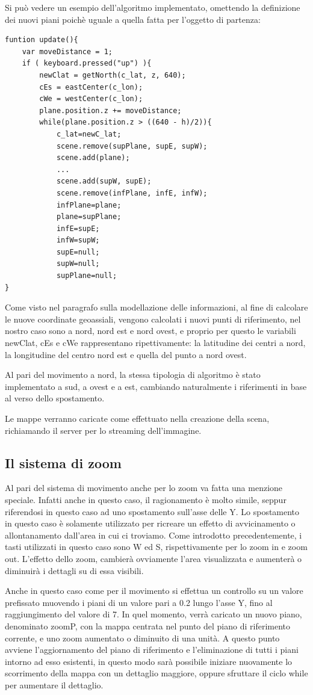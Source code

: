 Si può vedere un esempio dell'algoritmo implementato, omettendo la definizione dei nuovi piani poichè uguale a quella fatta per l'oggetto di partenza: 
\begin{verbatim}
funtion update(){
	var moveDistance = 1;
	if ( keyboard.pressed("up") ){
	    newClat = getNorth(c_lat, z, 640);
	    cEs = eastCenter(c_lon);
	    cWe = westCenter(c_lon);
	    plane.position.z += moveDistance;
	    while(plane.position.z > ((640 - h)/2)){
            c_lat=newC_lat;
            scene.remove(supPlane, supE, supW);
            scene.add(plane);
            ...
            scene.add(supW, supE);
            scene.remove(infPlane, infE, infW);
            infPlane=plane;
            plane=supPlane;
            infE=supE;
            infW=supW;
            supE=null;
            supW=null;
            supPlane=null;
}
\end{verbatim}
Come visto nel paragrafo sulla modellazione delle informazioni, al fine di calcolare le nuove coordinate geoassiali, vengono calcolati i nuovi punti di riferimento, nel nostro caso sono a nord, nord est e nord ovest, e proprio per questo le variabili newClat, cEs e cWe rappresentano ripettivamente: la latitudine dei centri a nord, la longitudine del centro nord est e quella del punto a nord ovest.

Al pari del movimento a nord, la stessa tipologia di algoritmo è stato implementato a sud, a ovest e a est, cambiando naturalmente i riferimenti in base al verso dello spostamento.

Le mappe verranno caricate come effettuato nella creazione della scena, richiamando il server per lo streaming dell'immagine.

\subsection{Il sistema di zoom}
Al pari del sistema di movimento anche per lo zoom va fatta una menzione speciale. Infatti anche in questo caso, il ragionamento è molto simile, seppur riferendosi in questo caso ad uno spostamento sull'asse delle Y. Lo spostamento in questo caso è solamente utilizzato per ricreare un effetto di avvicinamento o allontanamento dall'area in cui ci troviamo. Come introdotto precedentemente, i tasti utilizzati in questo caso sono W ed S, rispettivamente per lo zoom in e zoom out. L'effetto dello zoom, cambierà ovviamente l'area visualizzata e aumenterà o diminuirà i dettagli su di essa visibili.

Anche in questo caso come per il movimento si effettua un controllo su un valore prefissato muovendo i piani di un valore pari a 0.2 lungo l'asse Y, fino al raggiungimento del valore di 7. In quel momento, verrà caricato un nuovo piano, denominato zoomP, con la mappa centrata nel punto del piano di riferimento corrente, e uno zoom aumentato o diminuito di una unità. A questo punto avviene l'aggiornamento del piano di riferimento e l'eliminazione di tutti i piani intorno ad esso esistenti, in questo modo sarà possibile iniziare nuovamente lo scorrimento della mappa con un dettaglio maggiore, oppure sfruttare il ciclo while per aumentare il dettaglio.


